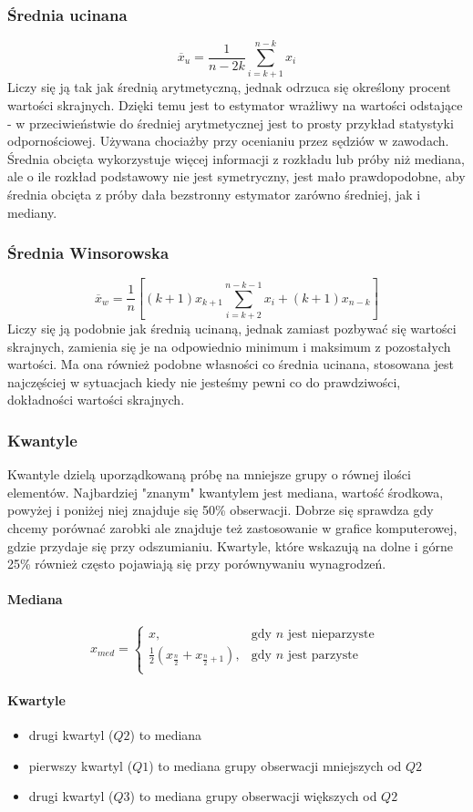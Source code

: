 \documentclass{article}
\theoremstyle{break}
\begin{document}
\subsubsection{Średnia ucinana}
$$\overline{x}_u=\frac{1}{n-2k}\sum\limits_{i=k+1}^{n-k}x_i$$
Liczy się ją tak jak średnią arytmetyczną, jednak odrzuca się określony procent wartości skrajnych. Dzięki temu jest to estymator wrażliwy na wartości odstające - w przeciwieństwie do średniej arytmetycznej jest to prosty przykład statystyki odpornościowej. Używana chociażby przy ocenianiu przez sędziów w zawodach. Średnia obcięta wykorzystuje więcej informacji z rozkładu lub próby niż mediana, ale o ile rozkład podstawowy nie jest symetryczny, jest mało prawdopodobne, aby średnia obcięta z próby dała bezstronny estymator zarówno średniej, jak i mediany.
\subsubsection{Średnia Winsorowska}
$$\overline{x}_w=\frac{1}{n}[(k+1)x_{k+1}\sum\limits_{i=k+2}^{n-k-1}x_i +(k+1)x_{n-k}]$$
Liczy się ją podobnie jak średnią ucinaną, jednak zamiast pozbywać się wartości skrajnych, zamienia się je na odpowiednio minimum i maksimum z pozostałych wartości. Ma ona również podobne własności co średnia ucinana, stosowana jest najczęściej w sytuacjach kiedy nie jesteśmy pewni co do prawdziwości, dokładności wartości skrajnych.
\subsubsection{Kwantyle}
Kwantyle dzielą uporządkowaną próbę na mniejsze grupy o równej ilości elementów. Najbardziej "znanym" kwantylem jest mediana, wartość środkowa, powyżej i poniżej niej znajduje się 50\% obserwacji. Dobrze się sprawdza gdy chcemy porównać zarobki ale znajduje też zastosowanie w grafice komputerowej, gdzie przydaje się przy odszumianiu. Kwartyle, które wskazują na dolne i górne 25\% również często pojawiają się przy porównywaniu wynagrodzeń.
\paragraph{Mediana}
$$x_{med}=
\begin{cases}
	x, &  \text{gdy $n$ jest nieparzyste }\\
	\frac{1}{2}(x_{\frac{n}{2}}+x_{\frac{n}{2}+1}), &  \text{gdy $n$ jest parzyste}\\
\end{cases}$$
\paragraph{Kwartyle}
\begin{itemize}
	\item drugi kwartyl ($Q2$) to mediana
	\item pierwszy kwartyl ($Q1$) to mediana grupy obserwacji mniejszych od $Q2$
	\item drugi kwartyl ($Q3$) to mediana grupy obserwacji większych od $Q2$
\end{itemize}
\end{document}
